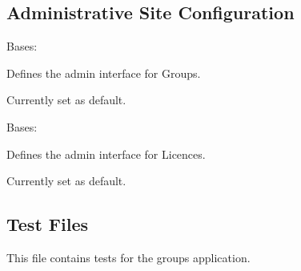 \documentclass[letterpaper,10pt,english]{sphinxmanual}
\begin{document}
\begin{fulllineitems}
\subsection{Administrative Site Configuration}
\label{api:id13}\label{api:module-groups.admin}

\begin{fulllineitems}
\label{api:groups.admin.GroupAdmin}
Bases: 

Defines the admin interface for Groups.

Currently set as default.

\begin{fulllineitems}
\label{api:groups.admin.GroupAdmin.media}
\end{fulllineitems}


\end{fulllineitems}


\begin{fulllineitems}
\label{api:groups.admin.LicenseAdmin}
Bases: 

Defines the admin interface for Licences.

Currently set as default.

\begin{fulllineitems}
\label{api:groups.admin.LicenseAdmin.media}
\end{fulllineitems}


\end{fulllineitems}



\subsection{Test Files}
\label{api:id14}\label{api:module-groups.tests}
This file contains tests for the groups application.


\end{fulllineitems}
\end{document}
